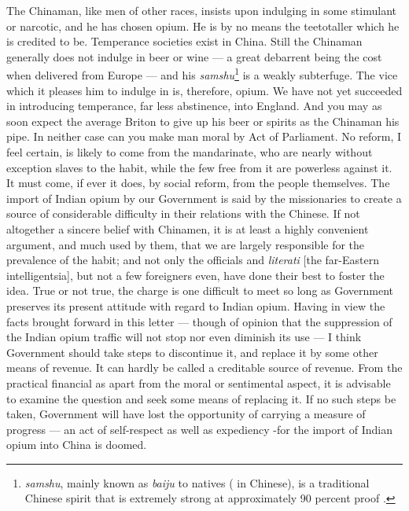 \begin{fancyquote}
	The Chinaman, like men of other races, insists upon indulging in some stimulant or narcotic, and he has chosen opium. He is by no means the teetotaller which he is credited to be. Temperance societies exist in China. Still the Chinaman generally does not indulge in beer or wine --- a great debarrent being the cost when delivered from Europe --- and his \textit{samshu}\footnote{\textit{samshu}, mainly known as \textit{baiju} to natives ( in Chinese), is a traditional Chinese spirit that is extremely strong at approximately 90 percent proof
	\autocite{Antkiewicz:1993}.} is a weakly subterfuge. The vice which it pleases him to indulge in is, therefore, opium. We have not yet succeeded in introducing temperance, far less abstinence, into England. And you may as soon expect the average Briton to give up his beer or spirits as the Chinaman his pipe. In neither case can you make man moral by Act of Parliament. No reform, I feel certain, is likely to come from the mandarinate, who are nearly without exception slaves to the habit, while the few free from it are powerless against it. It must come, if ever it does, by social reform, from the people themselves. The import of Indian opium by our Government is said by the missionaries to create a source of considerable difficulty in their relations with the Chinese. If not altogether a sincere belief with Chinamen, it is at least a highly convenient argument, and much used by them, that we are largely responsible for the prevalence of the habit; and not only the officials and \textit{literati} [the far-Eastern intelligentsia], but not a few foreigners even, have done their best to foster the idea. True or not true, the charge is one difficult to meet so long as Government preserves its present attitude with regard to Indian opium. Having in view the facts brought forward in this letter --- though of opinion that the suppression of the Indian opium traffic will not stop nor even diminish its use --- I think Government should take steps to discontinue it, and replace it by some other means of revenue. It can hardly be called a creditable source of revenue. From the practical financial as apart from the moral or sentimental aspect, it is advisable to examine the question and seek some means of replacing it. If no such steps be taken, Government will have lost the opportunity of carrying a measure of progress --- an act of self-respect as well as expediency -for the import of Indian opium into China is doomed.
	\begin{flushright}
		\autocite{SpecialCorrespondent:1884}
	\end{flushright}
\end{fancyquote}
